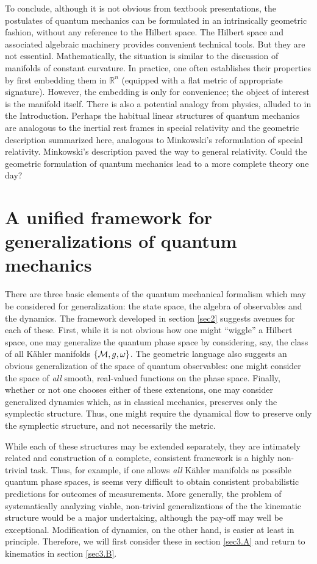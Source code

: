 \documentclass[12pt,aps,eqsecnum,tighten,nofootinbib]{revtex4-2}
\def\M{{\cal M}}
\def\w{\omega}
\def\R{\mathbb R}
\begin{document}
To conclude, although it is not obvious from textbook presentations,
the postulates of quantum mechanics can be formulated in an
intrinsically geometric fashion, without any reference to the Hilbert
space. The Hilbert space and associated algebraic machinery provides
convenient technical tools. But they are not
essential. Mathematically, the situation is similar to the discussion
of manifolds of constant curvature.  In practice, one often
establishes their properties by first embedding them in $\R^n$
(equipped with a flat metric of appropriate signature). However, the
embedding is only for convenience; the object of interest is the
manifold itself. There is also a potential analogy from physics,
alluded to in the Introduction.  Perhaps the habitual linear
structures of quantum mechanics are analogous to the inertial rest
frames in special relativity and the geometric description summarized
here, analogous to Minkowski's reformulation of special relativity.
Minkowski's description paved the way to general relativity.  Could
the geometric formulation of quantum mechanics lead to a more complete
theory one day?


\section{A unified framework for generalizations of quantum 
mechanics} \label{sec3}

There are three basic elements of the quantum mechanical formalism
which may be considered for generalization: the state space, the
algebra of observables and the dynamics.  The framework developed in
section \ref{sec2} suggests avenues for each of these.  First, while
it is not obvious how one might ``wiggle'' a Hilbert space, one may
generalize the quantum phase space by considering, say, the class of
all K\"ahler manifolds $\{ \M, g, \w \}$.  The geometric language also
suggests an obvious generalization of the space of quantum
observables: one might consider the space of {\em all} smooth,
real-valued functions on the phase space.  Finally, whether or not one
chooses either of these extensions, one may consider generalized
dynamics which, as in classical mechanics, preserves only the
symplectic structure. Thus, one might require the dynamical flow to
preserve only the symplectic structure, and not necessarily the
metric.

While each of these structures may be extended separately, they are
intimately related and construction of a complete, consistent
framework is a highly non-trivial task. Thus, for example, if one
allows {\it all} K\"ahler manifolds as possible quantum phase spaces,
is seems very difficult to obtain consistent probabilistic predictions
for outcomes of measurements. More generally, the problem of
systematically analyzing viable, non-trivial generalizations of the
the kinematic structure would be a major undertaking, although the
pay-off may well be exceptional. Modification of dynamics, on the
other hand, is easier at least in principle. Therefore, we will first
consider these in section \ref{sec3.A} and return to kinematics in
section \ref{sec3.B}.
\end{document}
